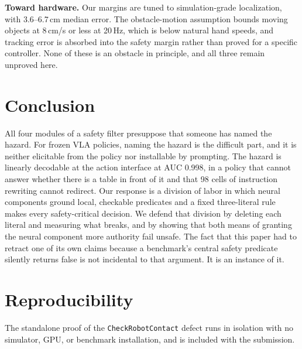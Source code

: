 \documentclass[conference]{IEEEtran}
\begin{document}
\textbf{Toward hardware.} Our margins are tuned to simulation-grade localization, with 3.6--6.7\,cm median error. The obstacle-motion assumption bounds moving objects at 8\,cm/s or less at 20\,Hz, which is below natural hand speeds, and tracking error is absorbed into the safety margin rather than proved for a specific controller. None of these is an obstacle in principle, and all three remain unproved here.

\section{Conclusion}

All four modules of a safety filter presuppose that someone has named the hazard. For frozen VLA policies, naming the hazard is the difficult part, and it is neither elicitable from the policy nor installable by prompting. The hazard is linearly decodable at the action interface at AUC 0.998, in a policy that cannot answer whether there is a table in front of it and that 98 cells of instruction rewriting cannot redirect. Our response is a division of labor in which neural components ground local, checkable predicates and a fixed three-literal rule makes every safety-critical decision. We defend that division by deleting each literal and measuring what breaks, and by showing that both means of granting the neural component more authority fail unsafe. The fact that this paper had to retract one of its own claims because a benchmark's central safety predicate silently returns false is not incidental to that argument. It is an instance of it.

\section*{Reproducibility}
The standalone proof of the \texttt{CheckRobotContact} defect runs in isolation with no simulator, GPU, or benchmark installation, and is included with the submission.
\end{document}
